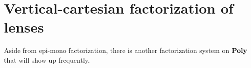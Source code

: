 \documentclass[Book-Poly]{subfiles}
\begin{document}




\section{Vertical-cartesian factorization of lenses}

Aside from epi-mono factorization, there is another factorization system on $\mathbf{Poly}$ that will show up frequently.
\end{document}
